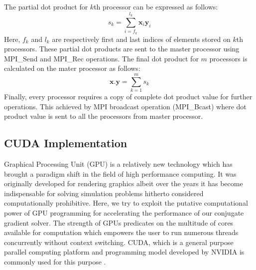 \documentclass[sigplan,screen]{acmart}
\begin{document}
The partial dot product for $k$th processor can be expressed as follows:
\begin{equation}
s_k =\sum_{i=f_k}^{l_k}\textbf{x}_i\textbf{y}_i
\end{equation}
Here, $f_k$ and $l_k$ are respectively first and last indices of elements stored on $k$th processors. These partial dot products are  sent to the master processor using MPI\_Send and MPI\_Rec operations. The final dot product for $m$ processors is calculated on the mater processor as follows:
\begin{equation}
\textbf{x}.\textbf{y}= \sum_{k=1}^{m}s_k
\end{equation}
Finally, every processor requires a copy of complete dot product value for further operations. This achieved by MPI broadcast operation (MPI\_Bcast) where dot product value is sent to all the processors from master processor.

\subsection{CUDA Implementation}
Graphical Processing Unit (GPU) is a relatively new technology which has brought a paradigm shift in the field of high performance computing. It was originally developed for rendering graphics albeit over the years it has become indispensable for solving simulation problems hitherto considered computationally prohibitive. Here, we try to exploit the putative computational power of GPU programming for accelerating the performance of our conjugate gradient solver. The strength of GPUs predicates on the multitude of cores available for computation which empowers the user to run numerous threads concurrently without context switching. CUDA, which is a general purpose parallel computing platform and programming model developed by NVIDIA is commonly used for this purpose \cite{nvidia2011nvidia}.
\end{document}
